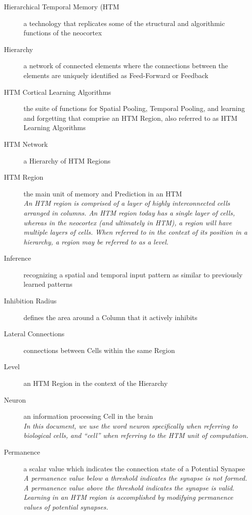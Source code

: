 \documentclass{report}
\begin{document}
\begin{description}
\item[Hierarchical Temporal Memory (HTM]{a technology that replicates
  some of the structural and algorithmic functions of the neocortex}

\item[Hierarchy]{a network of connected elements where the connections
  between the elements are uniquely identified as Feed-Forward or
  Feedback}

\item[HTM Cortical Learning Algorithms]{the suite of functions for
  Spatial Pooling, Temporal Pooling, and learning and forgetting that
  comprise an HTM Region, also referred to as HTM Learning Algorithms}

\item[HTM Network]{a Hierarchy of HTM Regions}

\item[HTM Region]{the main unit of memory and Prediction in an
  HTM\\{\em An HTM region is comprised of a layer of highly
    interconnected cells arranged in columns. An HTM region today has
    a single layer of cells, whereas in the neocortex (and ultimately
    in HTM), a region will have multiple layers of cells. When
    referred to in the context of its position in a hierarchy, a
    region may be referred to as a level.}}

\item[Inference]{recognizing a spatial and temporal input pattern as
  similar to previously learned patterns}

\item[Inhibition Radius]{defines the area around a Column that it
  actively inhibits}

\item[Lateral Connections]{connections between Cells within the same
  Region}

\item[Level]{an HTM Region in the context of the Hierarchy}

\item[Neuron]{an information processing Cell in the brain\\{\em In
    this document, we use the word neuron specifically when referring
    to biological cells, and ``cell'' when referring to the HTM unit
    of computation.}}

\item[Permanence]{a scalar value which indicates the connection state
  of a Potential Synapse\\{\em A permanence value below a threshold
    indicates the synapse is not formed. A permanence value above the
    threshold indicates the synapse is valid. Learning in an HTM
    region is accomplished by modifying permanence values of potential
    synapses.}}


\end{description}
\end{document}
